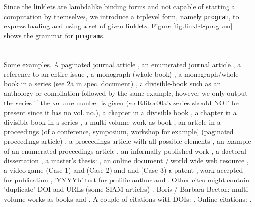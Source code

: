 \documentclass[sigplan,screen,anonymous]{acmart}
\def\dash {\text{-}}
\begin{document}
Since the linklets are lambda\dash like binding forms and not capable
of starting a computation by themselves, we introduce a top\dash level
form, namely \verb|program|, to express loading and using a set of
given linklets. Figure \ref{fig:linklet-program} shows the grammar for
\verb|program|s. 

\newpage
\section{}
Some examples.  A paginated journal article \cite{Abril07}, an enumerated journal article \cite{Cohen07}, a reference to an entire issue \cite{JCohen96}, a monograph (whole book) \cite{Kosiur01}, a monograph/whole book in a series (see 2a in spec. document)
\cite{Harel79}, a divisible-book such as an anthology or compilation \cite{Editor00} followed by the same example, however we only output the series if the volume number is given \cite{Editor00a} (so Editor00a's series should NOT be present since it has no vol. no.),
a chapter in a divisible book \cite{Spector90}, a chapter in a divisible book in a series \cite{Douglass98}, a multi-volume work as book \cite{Knuth97}, an article in a proceedings (of a conference, symposium, workshop for example) (paginated proceedings article) \cite{Andler79}, a proceedings article with all possible elements \cite{Smith10}, an example of an enumerated proceedings article \cite{VanGundy07}, an informally published work \cite{Harel78}, a doctoral dissertation \cite{Clarkson85}, a master's thesis: \cite{anisi03}, an online document / world wide web resource \cite{Thornburg01, Ablamowicz07, Poker06}, a video game (Case 1) \cite{Obama08} and (Case 2) \cite{Novak03} and \cite{Lee05} and (Case 3) a patent \cite{JoeScientist001}, work accepted for publication \cite{rous08}, 'YYYYb'-test for prolific author \cite{SaeediMEJ10} and \cite{SaeediJETC10}. Other cites might contain 'duplicate' DOI and URLs (some SIAM articles) \cite{Kirschmer:2010:AEI:1958016.1958018}. Boris / Barbara Beeton: multi-volume works as books \cite{MR781536} and \cite{MR781537}. A couple of citations with DOIs: \cite{2004:ITE:1009386.1010128,Kirschmer:2010:AEI:1958016.1958018}. Online citations: \cite{TUGInstmem, Thornburg01, CTANacmart}.

%

%



%
\end{document}
